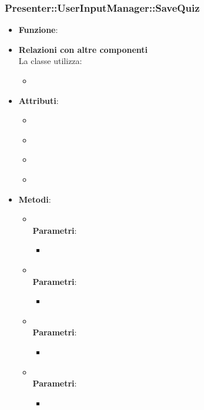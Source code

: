\subsubsection{Presenter::UserInputManager::SaveQuiz}
\begin{itemize}
\item\textbf{Funzione}:
\item\textbf{Relazioni con altre componenti}\\
La classe utilizza:
	\begin{itemize}
		\item
	\end{itemize}
\item\textbf{Attributi}:
	\begin{itemize}
		\item\code{}\\
		\item\code{}\\
		\item\code{}\\
		\item\code{}\\
	\end{itemize}
\item\textbf{Metodi}:
	\begin{itemize}
		\item\code{}\\
		\textbf{Parametri}:
			\begin{itemize}
				\item\code{}\\
			\end{itemize}
		\item\code{}\\
		\textbf{Parametri}:
			\begin{itemize}
				\item\code{}\\
			\end{itemize}
		\item\code{}\\
		\textbf{Parametri}:
			\begin{itemize}
				\item\code{}\\
			\end{itemize}
		\item\code{}\\
		\textbf{Parametri}:
			\begin{itemize}
				\item\code{}\\
			\end{itemize}
	\end{itemize}
\end{itemize}

